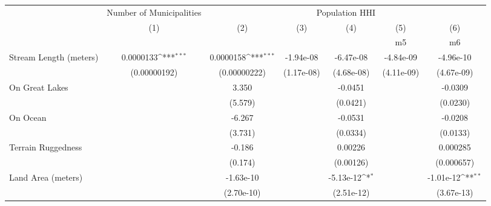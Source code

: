 {
\def\sym#1{\ifmmode^{#1}\else\(^{#1}\)\fi}
\begin{tabular}{l*{6}{c}}
\hline\hline
                    &\multicolumn{1}{c}{Number of Municipalities}&\multicolumn{5}{c}{Population HHI}                                                                           \\
                    &\multicolumn{1}{c}{(1)}&\multicolumn{1}{c}{(2)}&\multicolumn{1}{c}{(3)}&\multicolumn{1}{c}{(4)}&\multicolumn{1}{c}{(5)}&\multicolumn{1}{c}{(6)}\\
                    &\multicolumn{1}{c}{} &\multicolumn{1}{c}{} &\multicolumn{1}{c}{} &\multicolumn{1}{c}{} &\multicolumn{1}{c}{m5}&\multicolumn{1}{c}{m6}\\
\hline
Stream Length (meters)&   0.0000133\sym{***}&   0.0000158\sym{***}&   -1.94e-08         &   -6.47e-08         &   -4.84e-09         &   -4.96e-10         \\
                    &(0.00000192)         &(0.00000222)         &  (1.17e-08)         &  (4.68e-08)         &  (4.11e-09)         &  (4.67e-09)         \\
[1em]
On Great Lakes      &                     &       3.350         &                     &     -0.0451         &                     &     -0.0309         \\
                    &                     &     (5.579)         &                     &    (0.0421)         &                     &    (0.0230)         \\
[1em]
On Ocean            &                     &      -6.267         &                     &     -0.0531         &                     &     -0.0208         \\
                    &                     &     (3.731)         &                     &    (0.0334)         &                     &    (0.0133)         \\
[1em]
Terrain Ruggedness  &                     &      -0.186         &                     &     0.00226         &                     &    0.000285         \\
                    &                     &     (0.174)         &                     &   (0.00126)         &                     &  (0.000657)         \\
[1em]
Land Area (meters)  &                     &   -1.63e-10         &                     &   -5.13e-12\sym{*}  &                     &   -1.01e-12\sym{**} \\
                    &                     &  (2.70e-10)         &                     &  (2.51e-12)         &                     &  (3.67e-13)         \\

\end{tabular}}
